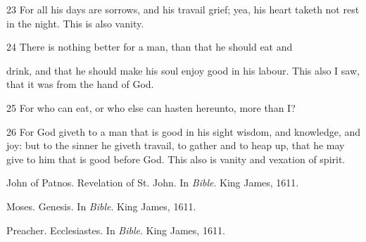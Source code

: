\documentclass[12pt]{report}
\begin{document}
23 For all his days are sorrows, and his travail grief; yea, his
   heart taketh not rest in the night. This is also vanity.
   
24 There is nothing better for a man, than that he should eat and
   
   drink, and that he should make his soul enjoy good in his
   labour. This
   also I saw, that it was from the hand of God.
   
25 For who can eat, or who else can hasten hereunto, more than I?
   
26 For God giveth to a man that is good in his sight wisdom, and
   knowledge, and joy: but to the sinner he giveth travail, to gather
   and
   to heap up, that he may give to him that is good before God. This
   also
   is vanity and vexation of spirit. 



    
%    

\begin{thebibliography}{1}

{John of Patnos}.
\newblock Revelation of {St.} {John}.
\newblock In {\em Bible}. King James, 1611.

Moses.
\newblock Genesis.
\newblock In {\em Bible}. King James, 1611.

Preacher.
\newblock Ecclesiastes.
\newblock In {\em Bible}. King James, 1611.

\end{thebibliography}

\onlinesignature
\end{document}
